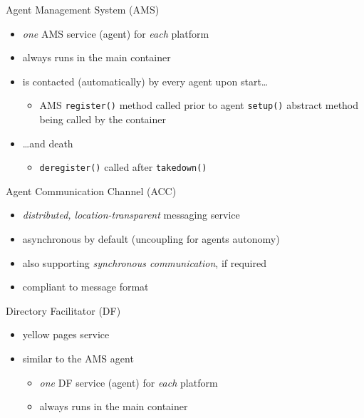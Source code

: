 \documentclass{beamer}\mode<presentation>{\usetheme{AMSCesenaPurpleAndGold}}
\begin{document}
\begin{frame}[c,allowframebreaks]
\begin{block}{Agent Management System (AMS)}
\begin{itemize}
            \item \emph{one} AMS service (agent) for \emph{each} \jade{} platform
            \item always runs in the main container
            \item is contacted (automatically) by every \jade{} agent upon start\ldots
            \begin{itemize}
                \item AMS \texttt{register()} method called prior to agent \texttt{setup()} abstract method being called by the container
            \end{itemize}
            \item \ldots and death
            \begin{itemize}
                \item \texttt{deregister()} called after \texttt{takedown()}
            \end{itemize}
        \end{itemize}
    \end{block}
    \begin{block}{Agent Communication Channel (ACC)}
        \begin{itemize}
            \item \jade{} \emph{distributed, location-transparent} \alert{messaging service}
            \item \alert{asynchronous} by default (uncoupling for agents autonomy)
            \item also supporting \emph{synchronous communication}, if required
            \item compliant to \fipa{} \acl{} message format
        \end{itemize}
    \end{block}
    \begin{block}{Directory Facilitator (DF)}
        \begin{itemize}
            \item \jade{} \alert{yellow pages} service
            \item similar to the AMS agent
            \begin{itemize}
                \item \emph{one} DF service (agent) for \emph{each} \jade{} platform
                \item always runs in the main container
            \end{itemize}

\end{itemize}
\end{block}
\end{frame}
\end{document}
